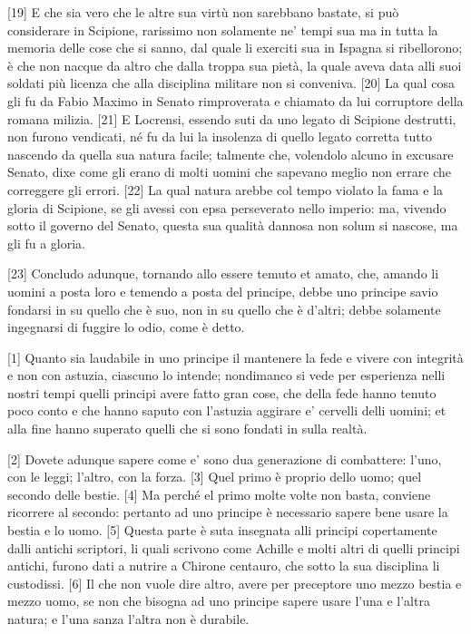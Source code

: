 \pagebreak

{[}19{]} E che sia vero che le altre sua virtù non sarebbano bastate, si
può considerare in Scipione, rarissimo non solamente ne' tempi sua ma in
tutta la memoria delle cose che si sanno, dal quale li exerciti sua in
Ispagna si ribellorono; è che non nacque da altro che dalla troppa sua
pietà, la quale aveva data alli suoi soldati più licenza che alla
disciplina militare non si conveniva. {[}20{]} La qual cosa gli fu da
Fabio Maximo in Senato rimproverata e chiamato da lui corruptore della
romana milizia. {[}21{]} E Locrensi, essendo suti da uno legato di
Scipione destrutti, non furono vendicati, né fu da lui la insolenza di
quello legato corretta tutto nascendo da quella sua natura facile;
talmente che, volendolo alcuno in excusare Senato, dixe come gli erano
di molti uomini che sapevano meglio non errare che correggere gli
errori. {[}22{]} La qual natura arebbe col tempo violato la fama e la
gloria di Scipione, se gli avessi con epsa perseverato nello imperio:
ma, vivendo sotto il governo del Senato, questa sua qualità dannosa non
solum si nascose, ma gli fu a gloria.

{[}23{]} Concludo adunque, tornando allo essere temuto et amato, che,
amando li uomini a posta loro e temendo a posta del principe, debbe uno
principe savio fondarsi in su quello che è suo, non in su quello che è
d'altri; debbe solamente ingegnarsi di fuggire lo odio, come è detto.


{[}1{]} Quanto sia laudabile in uno principe il mantenere la fede e
vivere con integrità e non con astuzia, ciascuno lo intende; nondimanco
si vede per esperienza nelli nostri tempi quelli principi avere fatto
gran cose, che della fede hanno tenuto poco conto e che hanno saputo con
l'astuzia aggirare e' cervelli delli uomini; et alla fine hanno superato
quelli che si sono fondati in sulla realtà.

{[}2{]} Dovete adunque sapere come e' sono dua generazione di
combattere: l'uno, con le leggi; l'altro, con la forza. {[}3{]} Quel
primo è proprio dello uomo; quel secondo delle bestie. {[}4{]} Ma perché
el primo molte volte non basta, conviene ricorrere al secondo: pertanto
ad uno principe è necessario sapere bene usare la bestia e lo uomo.
{[}5{]} Questa parte è suta insegnata alli principi copertamente dalli
antichi scriptori, li quali scrivono come Achille e molti altri di
quelli principi antichi, furono dati a nutrire a Chirone centauro, che
sotto la sua disciplina li custodissi. {[}6{]} Il che non vuole dire
altro, avere per preceptore uno mezzo bestia e mezzo uomo, se non che
bisogna ad uno principe sapere usare l'una e l'altra natura; e l'una
sanza l'altra non è durabile.

